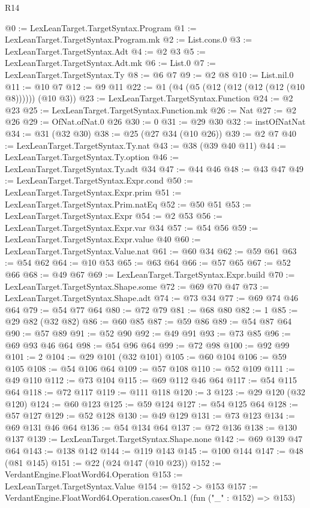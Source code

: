 \begin{lexlean}{R14}
\begin{coremodule}
@0 := LexLeanTarget.TargetSyntax.Program
@1 := LexLeanTarget.TargetSyntax.Program.mk
@2 := List.cons.{0}
@3 := LexLeanTarget.TargetSyntax.Adt
@4 := @2 @3
@5 := LexLeanTarget.TargetSyntax.Adt.mk
@6 := List.{0}
@7 := LexLeanTarget.TargetSyntax.Ty
@8 := @6 @7
@9 := @2 @8
@10 := List.nil.{0}
@11 := @10 @7
@12 := @9 @11
@22 := @1 (@4 (@5 (@12 (@12 (@12 (@12 (@10 @8)))))) (@10 @3))
@23 := LexLeanTarget.TargetSyntax.Function
@24 := @2 @23
@25 := LexLeanTarget.TargetSyntax.Function.mk
@26 := Nat
@27 := @2 @26
@29 := OfNat.ofNat.{0} @26
@30 := 0
@31 := @29 @30
@32 := instOfNatNat
@34 := @31 (@32 @30)
@38 := @25 (@27 @34 (@10 @26))
@39 := @2 @7
@40 := LexLeanTarget.TargetSyntax.Ty.nat
@43 := @38 (@39 @40 @11)
@44 := LexLeanTarget.TargetSyntax.Ty.option
@46 := LexLeanTarget.TargetSyntax.Ty.adt @34
@47 := @44 @46
@48 := @43 @47
@49 := LexLeanTarget.TargetSyntax.Expr.cond
@50 := LexLeanTarget.TargetSyntax.Expr.prim
@51 := LexLeanTarget.TargetSyntax.Prim.natEq
@52 := @50 @51
@53 := LexLeanTarget.TargetSyntax.Expr
@54 := @2 @53
@56 := LexLeanTarget.TargetSyntax.Expr.var @34
@57 := @54 @56
@59 := LexLeanTarget.TargetSyntax.Expr.value @40
@60 := LexLeanTarget.TargetSyntax.Value.nat
@61 := @60 @34
@62 := @59 @61
@63 := @54 @62
@64 := @10 @53
@65 := @63 @64
@66 := @57 @65
@67 := @52 @66
@68 := @49 @67
@69 := LexLeanTarget.TargetSyntax.Expr.build
@70 := LexLeanTarget.TargetSyntax.Shape.some
@72 := @69 @70 @47
@73 := LexLeanTarget.TargetSyntax.Shape.adt
@74 := @73 @34
@77 := @69 @74 @46 @64
@79 := @54 @77 @64
@80 := @72 @79
@81 := @68 @80
@82 := 1
@85 := @29 @82 (@32 @82)
@86 := @60 @85
@87 := @59 @86
@89 := @54 @87 @64
@90 := @57 @89
@91 := @52 @90
@92 := @49 @91
@93 := @73 @85
@96 := @69 @93 @46 @64
@98 := @54 @96 @64
@99 := @72 @98
@100 := @92 @99
@101 := 2
@104 := @29 @101 (@32 @101)
@105 := @60 @104
@106 := @59 @105
@108 := @54 @106 @64
@109 := @57 @108
@110 := @52 @109
@111 := @49 @110
@112 := @73 @104
@115 := @69 @112 @46 @64
@117 := @54 @115 @64
@118 := @72 @117
@119 := @111 @118
@120 := 3
@123 := @29 @120 (@32 @120)
@124 := @60 @123
@125 := @59 @124
@127 := @54 @125 @64
@128 := @57 @127
@129 := @52 @128
@130 := @49 @129
@131 := @73 @123
@134 := @69 @131 @46 @64
@136 := @54 @134 @64
@137 := @72 @136
@138 := @130 @137
@139 := LexLeanTarget.TargetSyntax.Shape.none
@142 := @69 @139 @47 @64
@143 := @138 @142
@144 := @119 @143
@145 := @100 @144
@147 := @48 (@81 @145)
@151 := @22 (@24 @147 (@10 @23))
@152 := VerdantEngine.FloatWord64.Operation
@153 := LexLeanTarget.TargetSyntax.Value
@154 := @152 -> @153
@157 := VerdantEngine.FloatWord64.Operation.casesOn.{1} (fun ("_" : @152) => @153)

\end{coremodule}
\end{lexlean}
